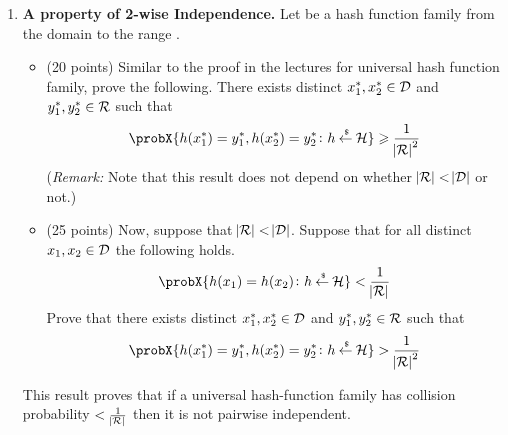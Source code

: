 \documentclass[11pt]{article}
\newcommand{\nextoddpage}{\checkoddpage\ifoddpage{\ \newpage\ \newpage}\else{\ \newpage}\fi}
\begin{document}
\begin{enumerate}
  {\bfseries Solution.} 
  \begin{itemize} 
  \item We will use Shamir's secret sharing to divide the secret encryption key among the two groups of 5 people each. \\
  gen: Generate secret key $\sk$ and use Shamir's secret sharing to divide $\sk$ into ($s_1$ and $s_2$) such that both shares are required. Key $s_1$ will then be divided among group 1 (individuals [1,2,3,4,5]) using Shamir's such that any 2 shares can unlock $s_1$. Key $s_2$ will be divided among group 2 (individuals [6,7,8,9,10]) using Shamir's such that any 3 shares can unlock $s_2$. \\
  enc: Encrypt message m with secret key $\sk$ \\
  dec: Determine $s_1$ using 2 shares from group 1, and $s_2$ using 3 shares from group 2. Use $s_1$ and $s_2$ to determine $\sk$ and use $\sk$ to decrypt cipher c
  \item $\sk$ is needed to decrypt cipher c, and $\sk$ can only be determined by both shares $s_1$ and $s_2$. Because of Shamir's secret sharing scheme, without all shares, the cipher c is still guaranteed to be secure. Even if an attacker obtained ($s_1$ or $s_2$) and (all except 1 share for the other), the cipher would still be secure.
  \end{itemize}
 






\nextoddpage 
\item {\bfseries A property of 2-wise Independence.} 
  Let \cH be a hash function family from the domain \cD to the range \cR. 
  \begin{itemize}
  \item (20 points) Similar to the proof in the lectures for universal hash function family, prove the following. 
    There exists distinct $x_1^*,x_2^*\in{\mathcal D}$ and $y_1^*,y_2^*\in{\mathcal R}$ such that 
      $$\probX{h(x^*_1)=y^*_1,h(x^*_2)=y^*_2\colon h\getsr\cH} \geq \frac1{\abs\cR^2}$$
    ({\em Remark:} Note that this result does not depend on whether $\abs{{\mathcal R}} < \abs{{\mathcal D}}$ or not.) 
  \item (25 points) Now, suppose that $\abs{{\mathcal R}} < \abs{{\mathcal D}}$. 
    Suppose that for all distinct $x_1,x_2\in{\mathcal D}$ the following holds.  
    $$\probX{h(x_1)=h(x_2)\colon h\getsr\cH} < \frac1{\abs\cR}$$
    Prove that there exists distinct $x_1^*,x_2^*\in{\mathcal D}$ and $y_1^*,y_2^*\in{\mathcal R}$ such that 
      $$\probX{h(x^*_1)=y^*_1,h(x^*_2)=y^*_2\colon h\getsr\cH} > \frac1{\abs\cR^2}$$
  \end{itemize}
  This result proves that if a universal hash-function family has collision probability $<\frac1{\abs{{\mathcal R}}}$ then it is not pairwise independent. 
  

\end{enumerate}
\end{document}
